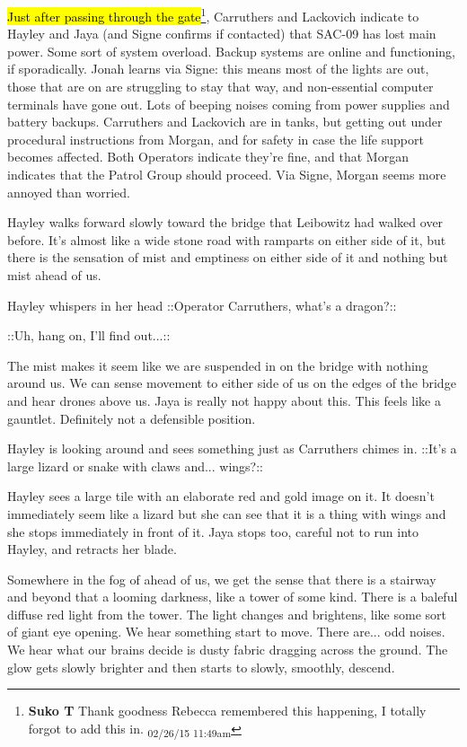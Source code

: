 \hl{Just after passing through the gate}\footnote{\textbf{Suko T }Thank goodness Rebecca remembered this happening, I totally forgot to add this in. \textsubscript{02/26/15 11:49am}}, Carruthers and Lackovich indicate to Hayley and Jaya (and Signe confirms if contacted) that SAC-09 has lost main power. Some sort of system overload. Backup systems are online and functioning, if sporadically. Jonah learns via Signe: this means most of the lights are out, those that are on are struggling to stay that way, and non-essential computer terminals have gone out. Lots of beeping noises coming from power supplies and battery backups. Carruthers and Lackovich are in tanks, but getting out under procedural instructions from Morgan, and for safety in case the life support becomes affected. Both Operators indicate they're fine, and that Morgan indicates that the Patrol Group should proceed. Via Signe, Morgan seems more annoyed than worried.



Hayley walks forward slowly toward the bridge that Leibowitz had walked over before.  It's almost like a wide stone road with ramparts on either side of it, but there is the sensation of mist and emptiness on either side of it and nothing but mist ahead of us.

Hayley whispers in her head  {\color[RGB]{255,153,0}::Operator Carruthers, what's a dragon?::} 

 {\color[RGB]{153,0,255}::Uh, hang on, I'll find out...::} 



The mist makes it seem like we are suspended in on the bridge with nothing around us.  We can sense movement to either side of us on the edges of the bridge and hear drones above us.  Jaya is really not happy about this.  This feels like a gauntlet.  Definitely not a defensible position.



Hayley is looking around and sees something just as Carruthers chimes in.  {\color[RGB]{153,0,255} ::It's a large lizard or snake with claws and... wings?::} 



Hayley sees a large tile with an elaborate red and gold image on it.  It doesn't immediately seem like a lizard but she can see that it is a thing with wings and she stops immediately in front of it.  Jaya stops too, careful not to run into Hayley, and retracts her blade.



Somewhere in the fog of ahead of us, we get the sense that there is a stairway and beyond that a looming darkness, like a tower of some kind.  There is a baleful diffuse red light from the tower.  The light changes and brightens, like some sort of giant eye opening.  We hear something start to move.  There are... odd noises.  We hear what our brains decide is dusty fabric dragging across the ground.  The glow gets slowly brighter and then starts to slowly, smoothly, descend.



